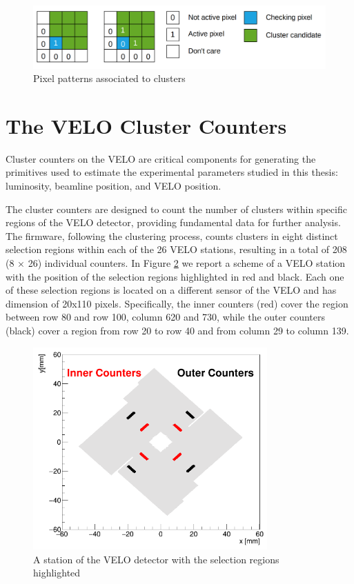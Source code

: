 \begin{figure}[h]
    \centering
    \includegraphics[width=\textwidth]{figures/cluster_recognition.png}
    \caption{Pixel patterns associated to clusters}
    \label{fig:cluster_recognition}
\end{figure}

\section{The VELO Cluster Counters}\label{sec:velo_counters}
Cluster counters on the VELO are critical components for generating the primitives used to estimate the experimental parameters studied in this thesis: luminosity, beamline position, and VELO position. 

The cluster counters are designed to count the number of clusters within specific regions of the VELO detector, providing fundamental data for further analysis. The firmware, following the clustering process, counts clusters in eight distinct selection regions within each of the 26 VELO stations, resulting in a total of 208 (8 × 26) individual counters. In Figure \ref{fig:VELO-counters} we report a scheme of a VELO station with the position of the selection regions highlighted in red and black. Each one of these selection regions is located on a different sensor of the VELO and has dimension of 20x110 pixels. Specifically, the inner counters (red) cover the region between row 80 and row 100, column 620 and 730, while the outer counters (black) cover a region from row 20 to row 40 and from column 29 to column 139.

\begin{figure}
    \centering
    \includegraphics[width=0.8\textwidth]{figures/counters.png}
    \caption{A station of the VELO detector with the selection regions highlighted}
    \label{fig:VELO-counters}
\end{figure}

